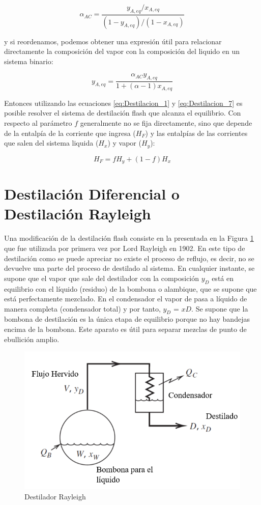 \documentclass[11pt]{book}
\begin{document}
\begin{equation}
    \label{eq:Destilacion_6}
    \alpha_{AC} = \frac{y_{A,eq}/x_{A,eq}}{(1-y_{A,eq})/(1-x_{A,eq})}
\end{equation}

y si reordenamos, podemos obtener una expresión útil para relacionar directamente la composición del vapor con la composición del liquido en un sistema binario:

\begin{equation}
    \label{eq:Destilacion_7}
    y_{A, eq} = \frac{\alpha_{AC} y_{A, eq}}{1 + (\alpha - 1)x_{A, eq}}
\end{equation}

Entonces utilizando las ecuaciones \ref{eq:Destilacion_1} y \ref{eq:Destilacion_7} es posible resolver el sistema de destilación flash que alcanza el equilibrio. Con respecto al parámetro $f$ generalmente no se fija directamente, sino que depende de la entalpía de la corriente que ingresa ($H_F$) y las entalpías de las corrientes que salen del sistema liquida ($H_x$) y vapor ($H_y$):

\begin{equation}
    \label{eq:Destilacion_8}
    H_F = f H_y + (1-f) H_x
\end{equation}

\section{Destilación Diferencial o Destilación Rayleigh}

Una modificación de la destilación flash consiste en la presentada en la Figura \ref{fig:DestiladorRayleigh} que fue utilizada por primera vez por Lord Rayleigh en 1902. En este tipo de destilación como se puede apreciar no existe el proceso de reflujo, es decir, no se devuelve una parte del proceso de destilado al sistema. En cualquier instante, se supone que el vapor que sale del destilador con la composición $y_D$ está en equilibrio con el líquido (residuo) de la bombona o alambique, que se supone que está perfectamente mezclado. En el condensador el vapor de pasa a líquido de manera completa (condensador total) y por tanto, $y_D$ = $xD$. Se supone que la bombona de destilación es la única etapa de equilibrio porque no hay bandejas encima de la bombona. Este aparato es útil para separar mezclas de punto de ebullición amplio.


\begin{figure}[H]
    \centering
    \includegraphics[width = 0.5\linewidth]{img/destilacion/Destilacion_Rayleigh.PNG}
    \caption{Destilador Rayleigh}
    \label{fig:DestiladorRayleigh}
\end{figure}
\end{document}
